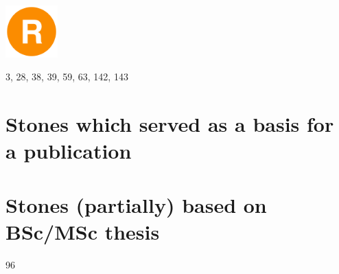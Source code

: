 \documentclass[a4paper,11pt]{report}
\begin{document}
\includegraphics[width=2cm]{images/R}

3, 28, 38, 39, 59, 63, 142, 143

\section{
Stones which served as a basis for a publication}



\section{
Stones (partially) based on BSc/MSc thesis}

96






\printbibliography
\end{document}
